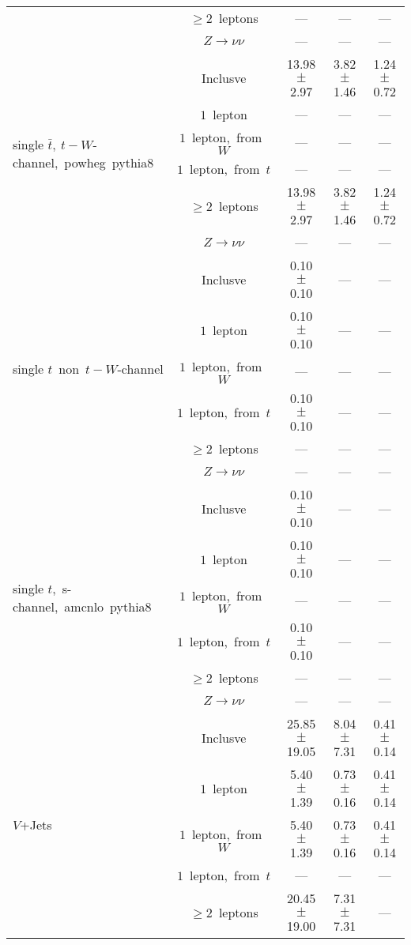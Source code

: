 \documentclass{article}
\begin{document}
\begin{longtable}{|l|c|c|c|c|}
 & $\ge2$~leptons  & ---  & ---  & --- \\* 
 & $Z\rightarrow\nu\nu$  & ---  & ---  & --- \\* 
\hline 
\multirow{6}{*}{single $\bar{t},~t-W$-channel,~powheg~pythia8} & Inclusve  & 13.98 $\pm$ 2.97  & 3.82 $\pm$ 1.46  & 1.24 $\pm$ 0.72 \\* 
 & $1$~lepton  & ---  & ---  & --- \\* 
 & $1$~lepton,~from~$W$  & ---  & ---  & --- \\* 
 & $1$~lepton,~from~$t$  & ---  & ---  & --- \\* 
 & $\ge2$~leptons  & 13.98 $\pm$ 2.97  & 3.82 $\pm$ 1.46  & 1.24 $\pm$ 0.72 \\* 
 & $Z\rightarrow\nu\nu$  & ---  & ---  & --- \\* 
\hline 
\multirow{6}{*}{single $t$~non~$t-W$-channel} & Inclusve  & 0.10 $\pm$ 0.10  & ---  & --- \\* 
 & $1$~lepton  & 0.10 $\pm$ 0.10  & ---  & --- \\* 
 & $1$~lepton,~from~$W$  & ---  & ---  & --- \\* 
 & $1$~lepton,~from~$t$  & 0.10 $\pm$ 0.10  & ---  & --- \\* 
 & $\ge2$~leptons  & ---  & ---  & --- \\* 
 & $Z\rightarrow\nu\nu$  & ---  & ---  & --- \\* 
\hline 
\multirow{6}{*}{single $t$,~s-channel,~amcnlo~pythia8} & Inclusve  & 0.10 $\pm$ 0.10  & ---  & --- \\* 
 & $1$~lepton  & 0.10 $\pm$ 0.10  & ---  & --- \\* 
 & $1$~lepton,~from~$W$  & ---  & ---  & --- \\* 
 & $1$~lepton,~from~$t$  & 0.10 $\pm$ 0.10  & ---  & --- \\* 
 & $\ge2$~leptons  & ---  & ---  & --- \\* 
 & $Z\rightarrow\nu\nu$  & ---  & ---  & --- \\* 
\hline 
\multirow{6}{*}{$V$+Jets} & Inclusve  & 25.85 $\pm$ 19.05  & 8.04 $\pm$ 7.31  & 0.41 $\pm$ 0.14 \\* 
 & $1$~lepton  & 5.40 $\pm$ 1.39  & 0.73 $\pm$ 0.16  & 0.41 $\pm$ 0.14 \\* 
 & $1$~lepton,~from~$W$  & 5.40 $\pm$ 1.39  & 0.73 $\pm$ 0.16  & 0.41 $\pm$ 0.14 \\* 
 & $1$~lepton,~from~$t$  & ---  & ---  & --- \\* 
 & $\ge2$~leptons  & 20.45 $\pm$ 19.00  & 7.31 $\pm$ 7.31  & --- \\* 

\end{longtable}
\end{document}
